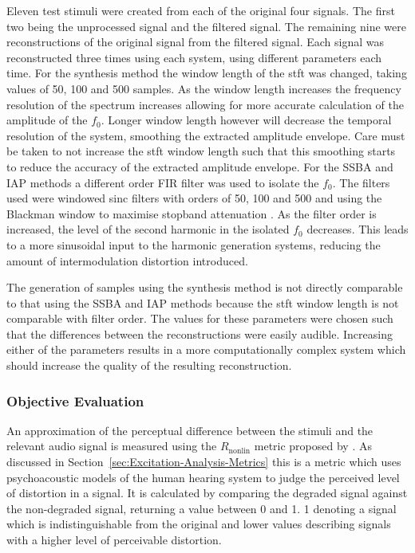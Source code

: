 			Eleven test stimuli were created from each of the original four signals. The first two being the
			unprocessed signal and the filtered signal. The remaining nine were reconstructions of the original
			signal from the filtered signal. Each signal was reconstructed three times using each system, using
			different parameters each time. For the synthesis method the window length of the \acrshort{stft}
			was changed, taking values of 50, 100 and 500 samples. As the window length increases the frequency
			resolution of the spectrum increases allowing for more accurate calculation of the amplitude of the
			$f_{0}$.  Longer window length however will decrease the temporal resolution of the system,
			smoothing the extracted amplitude envelope. Care must be taken to not increase the \acrshort{stft}
			window length such that this smoothing starts to reduce the accuracy of the extracted amplitude
			envelope.  For the SSBA and IAP methods a different order FIR filter was used to isolate the
			$f_{0}$. The filters used were windowed sinc filters with orders of 50, 100 and 500 and using the
			Blackman window to maximise stopband attenuation \citep{schlichtharle2011digital}. As the filter
			order is increased, the level of the second harmonic in the isolated $f_{0}$ decreases. This leads
			to a more sinusoidal input to the harmonic generation systems, reducing the amount of
			intermodulation distortion introduced.

			The generation of samples using the synthesis method is not directly comparable to that using the
			SSBA and IAP methods because the \acrshort{stft} window length is not comparable with filter order.
			The values for these parameters were chosen such that the differences between the reconstructions
			were easily audible. Increasing either of the parameters results in a more computationally complex
			system which should increase the quality of the resulting reconstruction.

		\subsubsection*{Objective Evaluation}
			An approximation of the perceptual difference between the stimuli and the relevant audio signal is
			measured using the $R_{\mathrm{nonlin}}$ metric proposed by \citet{tan2004predicting}. As discussed
			in Section~\ref{sec:Excitation-Analysis-Metrics} this is a metric which uses psychoacoustic models
			of the human hearing system to judge the perceived level of distortion in a signal. It is
			calculated by comparing the degraded signal against the non-degraded signal, returning a value
			between 0 and 1. 1 denoting a signal which is indistinguishable from the original and lower values
			describing signals with a higher level of perceivable distortion.

